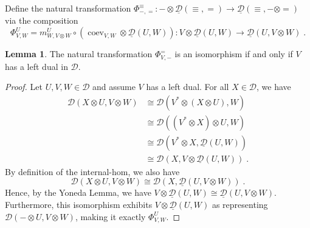 \documentclass[12pt,dvipsnames]{article}
\numberwithin{equation}{section}
\theoremstyle{definition}
\newtheorem{lemma}[definition]{Lemma}
\newcommand{\cat}[1]{\mathcal{#1}}
\newcommand{\1}{\ensuremath{\mathbbm{1}}}
\DeclareMathOperator{\coev}{coev}
\newcommand{\blank}{{-}}
\newcommand{\bblank}{{=}}
\newcommand{\bbblank}{{\equiv}}
\begin{document}
Define the natural transformation $\Phi_{\blank,\bblank}^\bbblank:\blank\otimes\underline{\cat{D}}(\bbblank,\bblank) \to \underline{\cat{D}}(\bbblank,\blank\otimes\bblank)$ via the composition
\begin{equation}\label{eq:Phi}
    \Phi_{V,W}^U = m_{W,V\otimes W}^U\circ(\coev_{V,W}\otimes \underline{\cat{D}}(U,W)): V\otimes\underline{\cat{D}}(U,W) \to \underline{\cat{D}}(U,V\otimes W) \;.
\end{equation}
\begin{lemma}\label{lem:PhisoIffRigid}
    The natural transformation $\Phi_{V,\blank}^\bblank$ is an isomorphism if and only if $V$ has a left dual in $\cat{D}$.
\end{lemma}
\begin{proof}
    Let $U,V,W\in\cat{D}$ and assume $V$ has a left dual. For all $X\in\cat{D}$, we have
    \begin{align}
        \cat{D}(X\otimes U,V\otimes W) &\cong \cat{D}(V^\ast\otimes(X\otimes U),W) \nonumber\\
        &\cong  \cat{D}((V^\ast\otimes X)\otimes U,W) \nonumber\\
        &\cong  \cat{D}(V^\ast\otimes X,\underline{\cat{D}}(U,W)) \nonumber\\
        &\cong  \cat{D}(X,V\otimes\underline{\cat{D}}(U,W)) \;.
    \end{align}
    By definition of the internal-hom, we also have
    \begin{equation}
        \cat{D}(X\otimes U,V\otimes W)\cong\cat{D}(X,\underline{\cat{D}}(U,V\otimes W)) \;.
    \end{equation}
    Hence, by the Yoneda Lemma, we have $V\otimes\underline{\cat{D}}(U,W) \cong \underline{\cat{D}}(U,V\otimes W)$. Furthermore, this isomorphism exhibits $V\otimes\underline{\cat{D}}(U,W)$ as representing $\cat{D}(\blank\otimes U,V\otimes W)$, making it exactly $\Phi_{V,W}^U$.


\end{proof}
\end{document}

